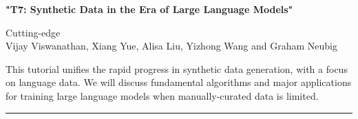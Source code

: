 \begin{center}
    \Large{\textbf{"T7: Synthetic Data in the Era of Large Language Models"}\\}
    \par\bigskip
    \large{Cutting-edge}\\
    \large{Vijay Viswanathan, Xiang Yue, Alisa Liu, Yizhong Wang and Graham Neubig}\\
    \par\bigskip

\end{center}

This tutorial unifies the rapid progress in synthetic data generation, with a focus on language data. 
We will discuss fundamental algorithms and major applications for training large language models when manually-curated data is limited.

\begin{center}
    \noindent\rule{200px}{1pt}
\end{center}
